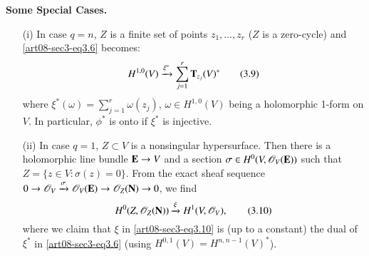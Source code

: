 \eject
\noindent
{\bf Some Special Cases.}
\begin{itemize}
\item[(i)] In case $q=n$, $Z$ is a finite set of points $z_{1},\ldots,z_{r}$ ($Z$ is a zero-cycle) and \eqref{art08-sec3-eq3.6} becomes:
\begin{equation*}
H^{1,0}(V)\xrightarrow{\xi^{*}}\sum\limits^{r}_{j=1}\mathbf{T}_{z_{j}}(V)^{*}\tag{3.9}\label{art08-sec3-eq3.9}
\end{equation*}
where $\xi^{*}(\omega)=\sum\limits^{r}_{j=1}\omega(z_{j})$, $\omega\in H^{1,0}(V)$ being a holomorphic 1-form on $V$. In particular, $\phi^{*}$ is onto if $\xi^{*}$ is injective.

\item[(ii)] In case $q=1$, $Z\subset V$ is a nonsingular hypersurface. Then there is a holomorphic line bundle $\mathbf{E}\to V$ and a section $\sigma\in H^{0}(V,\mathscr{O}_{V}(\mathbf{E}))$ such that $Z=\{z\in V:\sigma(z)=0\}$. From the exact sheaf sequence $0\to \mathscr{O}_{V}\xrightarrow{\sigma}\mathscr{O}_{V}(\mathbf{E})\to \mathscr{O}_{Z}(\mathbf{N})\to 0$, we find
\begin{equation*}
H^{0}(Z,\mathscr{O}_{Z}(\mathbf{N}))\xrightarrow{\xi}H^{1}(V,\mathscr{O}_{V}),\tag{3.10}\label{art08-sec3-eq3.10}
\end{equation*}
where we claim that $\xi$ in \eqref{art08-sec3-eq3.10} is (up to a constant) the dual of $\xi^{*}$ in \eqref{art08-sec3-eq3.6} (using $H^{0,1}(V)=H^{n,n-1}(V)^{*}$).
\end{itemize}

